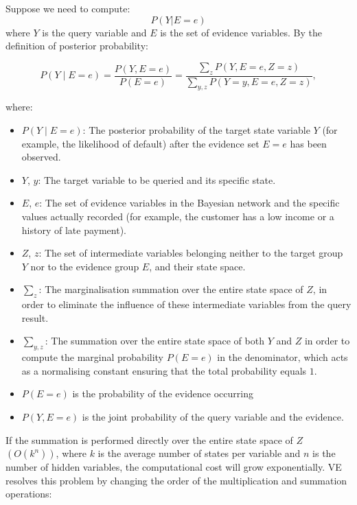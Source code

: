 \vspace{1em}
Suppose we need to compute:
$$P(Y|E=e)$$ 
where $Y$ is the query variable and $E$ is the set of evidence variables. By the definition of posterior probability:

\begin{equation}
    P(Y \mid E = e) = \frac{P(Y, E = e)}{P(E = e)} = \frac{\sum_{z} P(Y, E = e, Z = z)}{\sum_{y, z} P(Y = y, E = e, Z = z)},
\end{equation}

\noindent
where:
\begin{itemize}
    \item $P(Y \mid E = e)$: The posterior probability of the target state variable $Y$ (for example, the likelihood of default) after the evidence set $E = e$ has been observed.
    \item $Y$, $y$: The target variable to be queried and its specific state.
    \item $E$, $e$: The set of evidence variables in the Bayesian network and the specific values actually recorded (for example, the customer has a low income or a history of late payment).
    \item $Z$, $z$: The set of intermediate variables belonging neither to the target group $Y$ nor to the evidence group $E$, and their state space.
    \item $\sum_z$: The marginalisation summation over the entire state space of $Z$, in order to eliminate the influence of these intermediate variables from the query result.
    \item $\sum_{y, z}$: The summation over the entire state space of both $Y$ and $Z$ in order to compute the marginal probability $P(E = e)$ in the denominator, which acts as a normalising constant ensuring that the total probability equals $1$.


\item $P(E=e)$ is the probability of the evidence occurring
\item $P(Y,E=e)$ is the joint probability of the query variable and the evidence. 
\end{itemize}

\vspace{1em}
If the summation is performed directly over the entire state space of $Z$ $(O(k^n))$, where $k$ is the average number of states per variable and $n$ is the number of hidden variables, the computational cost will grow exponentially. VE resolves this problem by changing the order of the multiplication and summation operations:

